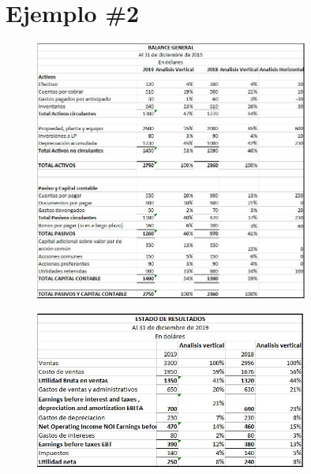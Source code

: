 \documentclass{article}
\begin{document}
\section{Ejemplo \#2}
\begin{figure}[H]
    \centering
    \includegraphics[width=0.8\textwidth]{bg1.jpeg}
\end{figure}
\begin{figure}[H]
    \centering
    \includegraphics[width=0.8\textwidth]{er1.jpeg}
\end{figure}
\end{document}

